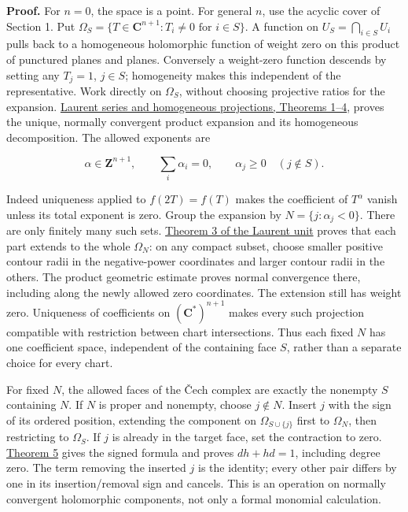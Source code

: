 \documentclass[11pt]{article}
\begin{document}
\textbf{Proof.} For \(n=0\), the space is a point. For general \(n\),
use the acyclic cover of Section 1. Put
\(\Omega_S=\{T\in\mathbf C^{n+1}:T_i\ne0\text{ for }i\in S\}\). A
function on \(U_S=\bigcap_{i\in S}U_i\) pulls back to a homogeneous
holomorphic function of weight zero on this product of punctured planes
and planes. Conversely a weight-zero function descends by setting any
\(T_j=1\), \(j\in S\); homogeneity makes this independent of the
representative. Work directly on \(\Omega_S\), without choosing
projective ratios for the expansion.
\href{../../human/elementary-analysis/laurent-series-and-homogeneous-projections.html\#2-products-of-annuli-and-discs}{Laurent
series and homogeneous projections, Theorems 1--4}, proves the unique,
normally convergent product expansion and its homogeneous decomposition.
The allowed exponents are

\[
\alpha\in\mathbf Z^{n+1},\qquad
\sum_i\alpha_i=0,\qquad
\alpha_j\geq0\quad(j\notin S).
\]

Indeed uniqueness applied to \(f(2T)=f(T)\) makes the coefficient of
\(T^\alpha\) vanish unless its total exponent is zero. Group the
expansion by \(N=\{j:\alpha_j<0\}\). There are only finitely many such
sets.
\href{../../human/elementary-analysis/laurent-series-and-homogeneous-projections.html\#3-extending-the-parts-with-specified-negative-powers}{Theorem
3 of the Laurent unit} proves that each part extends to the whole
\(\Omega_N\): on any compact subset, choose smaller positive contour
radii in the negative-power coordinates and larger contour radii in the
others. The product geometric estimate proves normal convergence there,
including along the newly allowed zero coordinates. The extension still
has weight zero. Uniqueness of coefficients on \((\mathbf C^*)^{n+1}\)
makes every such projection compatible with restriction between chart
intersections. Thus each fixed \(N\) has one coefficient space,
independent of the containing face \(S\), rather than a separate choice
for every chart.

For fixed \(N\), the allowed faces of the Čech complex are exactly the
nonempty \(S\) containing \(N\). If \(N\) is proper and nonempty, choose
\(j\notin N\). Insert \(j\) with the sign of its ordered position,
extending the component on \(\Omega_{S\cup\{j\}}\) first to
\(\Omega_N\), then restricting to \(\Omega_S\). If \(j\) is already in
the target face, set the contraction to zero.
\href{../../human/elementary-analysis/laurent-series-and-homogeneous-projections.html\#4-homogeneous-functions-and-the-ordered-complex}{Theorem
5} gives the signed formula and proves \(dh+hd=1\), including degree
zero. The term removing the inserted \(j\) is the identity; every other
pair differs by one in its insertion/removal sign and cancels. This is
an operation on normally convergent holomorphic components, not only a
formal monomial calculation.
\end{document}

